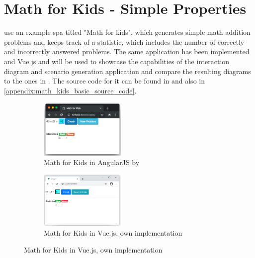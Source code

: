 \section{Math for Kids - Simple Properties}
\textcite{zhang2019scenario} use an example \gls{spa} titled "Math for kids", which generates simple math addition problems and keeps track of a statistic, which includes the number of correctly and incorrectly answered problems. The same application has been implemented and Vue.js and will be used to showcase the capabilities of the interaction diagram and scenario generation application and compare the resulting diagrams to the ones in \parencite{zhang2019scenario}. The source code for it can be found in  and also in \ref{appendix:math_kids_basic_source_code}.

\begin{figure}[H]
    \centering
    \begin{subfigure}[t]{0.45\textwidth}
         \centering
         \includegraphics[width=0.45\textwidth]{images/math_for_kids_zhang.png}
         \caption{Math for Kids in AngularJS by \textcite{zhang2019scenario}}
    \end{subfigure}\hfill%
    \begin{subfigure}[t]{0.45\textwidth}
        \centering
        \includegraphics[width=0.45\textwidth]{images/math_for_kids_own.png}
        \caption{Math for Kids in Vue.js, own implementation}
    \end{subfigure}
\end{figure}


